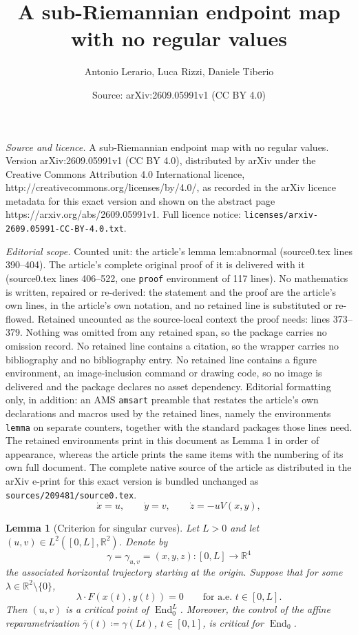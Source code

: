 \documentclass[10pt,a4paper]{amsart}
\title{A sub-Riemannian endpoint map with no regular values}
\author{Antonio Lerario, Luca Rizzi, Daniele Tiberio}
\date{Source: arXiv:2609.05991v1 (CC BY 4.0)}
\newtheorem{lemma}{Lemma}
\newcommand{\End}{\operatorname{End}}
\newcommand{\R}{\mathbb R}
\begin{document}
\maketitle

\noindent\emph{Source and licence.} A sub-Riemannian endpoint map with no regular values. Version arXiv:2609.05991v1 (CC BY 4.0), distributed by arXiv under the Creative Commons Attribution 4.0 International licence, http://creativecommons.org/licenses/by/4.0/, as recorded in the arXiv licence metadata for this exact version and shown on the abstract page https://arxiv.org/abs/2609.05991v1. Full licence notice: \texttt{licenses/arxiv-2609.05991-CC-BY-4.0.txt}.\par\smallskip

\noindent\textit{Editorial scope.} Counted unit: the article's lemma lem:abnormal (source0.tex lines 390--404). The article's complete original proof of it is delivered with it (source0.tex lines 406--522, one \texttt{proof} environment of 117 lines). No mathematics is written, repaired or re-derived: the statement and the proof are the article's own lines, in the article's own notation, and no retained line is substituted or re-flowed.  Retained uncounted as the source-local context the proof needs: lines 373--379.  Nothing was omitted from any retained span, so the package carries no omission record.  No retained line contains a citation, so the wrapper carries no bibliography and no bibliography entry.  No retained line contains a figure environment, an image-inclusion command or drawing code, so no image is delivered and the package declares no asset dependency.  Editorial formatting only, in addition: an AMS \texttt{amsart} preamble that restates the article's own declarations and macros used by the retained lines, namely the environments \texttt{lemma} on separate counters, together with the standard packages those lines need.  The retained environments print in this document as Lemma 1 in order of appearance, whereas the article prints the same items with the numbering of its own full document.  The complete native source of the article as distributed in the arXiv e-print for this exact version is bundled unchanged as \texttt{sources/209481/source0.tex}.
\begin{equation}\label{eq:triangular-system}
 \dot x=u,
 \qquad
 \dot y=v,
 \qquad
 \dot z=-uV(x,y),
\end{equation}

\begin{lemma}[Criterion for singular curves]\label{lem:abnormal}
Let $L>0$ and let $(u,v)\in L^2([0,L],\R^2)$.  Denote by
\begin{equation}
 \gamma=\gamma_{u,v}=(x,y,z):[0,L]\longrightarrow\R^4
\end{equation}
the associated horizontal trajectory starting at the origin.  Suppose that for some 
$\lambda \in\R^2\setminus\{0\}$,
\begin{equation}
 \lambda\cdot F(x(t),y(t))=0
 \qquad\text{for a.e. }t\in[0,L].
\end{equation}
Then $(u,v)$ is a critical point of $\End_0^L$.  Moreover, the
control of the affine reparametrization
$\bar\gamma(t)\coloneq \gamma(Lt)$, $t\in[0,1]$, is critical for $\End_0$.
\end{lemma}
\end{document}
